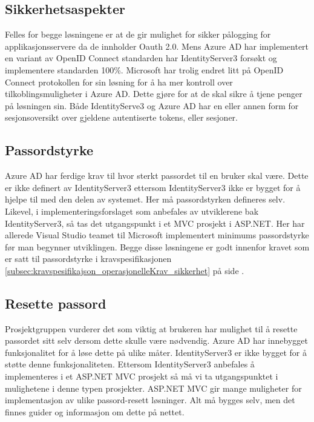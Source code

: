 \subsection{Sikkerhetsaspekter}
\label{sec:valgAvLosning_muligeLosninger_sikkerhetsaspekter}
Felles for begge løsningene er at de gir mulighet for sikker pålogging for applikasjonsservere da de innholder Oauth 2.0. Mens Azure AD har implementert en variant av OpenID Connect standarden har IdentityServer3 forsøkt og implementere standarden 100\%. Microsoft har trolig endret litt på OpenID Connect protokollen for sin løsning for å ha mer kontroll over tilkoblingsmuligheter i Azure AD. Dette gjøre for at de skal sikre å tjene penger på løsningen sin. Både IdentityServe3 og Azure AD har en eller annen form for sesjonsoversikt over gjeldene autentiserte tokens, eller sesjoner. 

\subsection*{Passordstyrke}
Azure AD har ferdige krav til hvor sterkt passordet til en bruker skal være. Dette er ikke definert av IdentityServer3 ettersom IdentityServer3 ikke er bygget for å hjelpe til med den delen av systemet. Her må passordstyrken defineres selv. Likevel, i implementeringsforslaget som anbefales av utviklerene bak IdentityServer3, så tas det utgangspunkt i et MVC prosjekt i ASP.NET. Her har allerede Visual Studio teamet til Microsoft implementert minimums passordstyrke før man begynner utviklingen. Begge disse løsningene er godt innenfor kravet som er satt til passordstyrke i kravspesifikasjonen \ref{subsec:kravspesifikajson_operasjonelleKrav_sikkerhet} på side \pageref{subsec:kravspesifikajson_operasjonelleKrav_sikkerhet}.

\subsection*{Resette passord}
Prosjektgruppen vurderer det som viktig at brukeren har mulighet til å resette passordet sitt selv dersom dette skulle være nødvendig. Azure AD har innebygget funksjonalitet for å løse dette på ulike måter. IdentityServer3 er ikke bygget for å støtte denne funksjonaliteten. Ettersom IdentityServer3 anbefales å implementeres i et ASP.NET MVC prosjekt så må vi ta utgangspunktet i mulighetene i denne typen prosjekter. ASP.NET MVC gir mange muligheter for implementasjon av ulike passord-resett løsninger. Alt må bygges selv, men det finnes guider og informasjon om dette på nettet.

